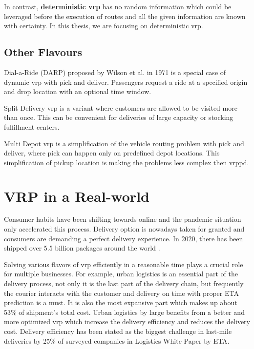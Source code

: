     In contrast, \textbf{deterministic \gls{vrp}} has no random information which could be leveraged before the execution of routes and all the given information are known with certainty. In this thesis, we are focusing on deterministic \gls{vrp}.
    
    \subsection{Other Flavours}
    Dial-a-Ride (DARP) proposed by Wilson et al. \cite{darp-proposed} in 1971 is a special case of dynamic \gls{vrp} with pick and deliver. Passengers request a ride at a specified origin and drop location with an optional time window. 
    
    \label{split-delivery}Split Delivery \gls{vrp} \cite{split-deliver} is a variant where customers are allowed to be visited more than once. This can be convenient for deliveries of large capacity or stocking fulfillment centers.
    
    Multi Depot \gls{vrp} is a simplification of the vehicle routing problem with pick and deliver, where pick can happen only on predefined depot locations. This simplification of pickup location is making the problems less complex then \gls{vrppd}.
    
\section{VRP in a Real-world}
Consumer habits have been shifting towards online and the pandemic situation only accelerated this process. Delivery option is nowadays taken for granted and consumers are demanding a perfect delivery experience. In 2020, there has been shipped over 5.5 billion packages around the world \cite{num-shipped-packages}.

Solving various flavors of \gls{vrp} efficiently in a reasonable time plays a crucial role for multiple businesses. For example, urban logistics is an essential part of the delivery process, not only it is the last part of the delivery chain, but frequently the courier interacts with the customer and delivery on time with proper ETA prediction is a must. It is also the most expansive part which makes up about 53\% of shipment’s total cost\cite{last-mile-cost}. Urban logistics by large benefits from a better and more optimized \gls{vrp} which increase the delivery efficiency and reduces the delivery cost. Delivery efficiency has been stated as the biggest challenge in last-mile deliveries by 25\% of surveyed companies in Logistics White Paper by ETA\cite{logistics-whitepaper}.

